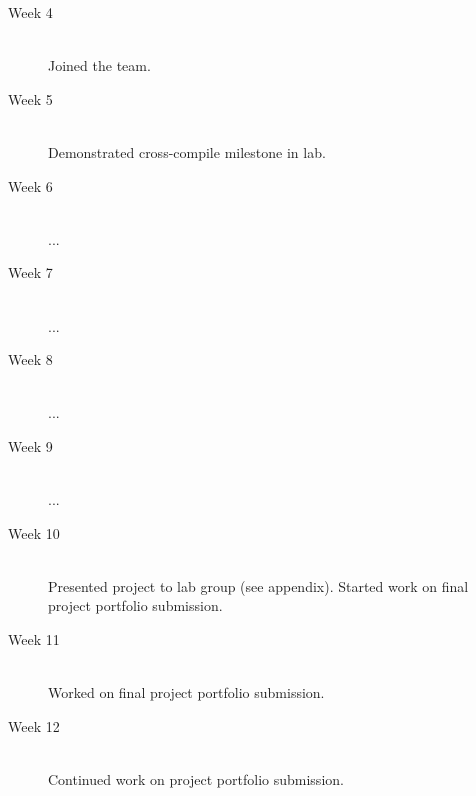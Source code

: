 \documentclass[11pt,a4paper,titlepage]{report}
\begin{document}
\begin{description}

  \item[Week 4] \hfill \\
      Joined the team.
  \item[Week 5] \hfill \\
      Demonstrated cross-compile milestone in lab.
  \item[Week 6] \hfill \\
      ...
  \item[Week 7] \hfill \\
      ...
  \item[Week 8] \hfill \\
      ...
  \item[Week 9] \hfill \\
      ...
  \item[Week 10] \hfill \\
      Presented project to lab group (see appendix). Started work on final project portfolio submission.
  \item[Week 11] \hfill \\
      Worked on final project portfolio submission.
  \item[Week 12] \hfill \\
      Continued work on project portfolio submission.

\end{description}
\end{document}
